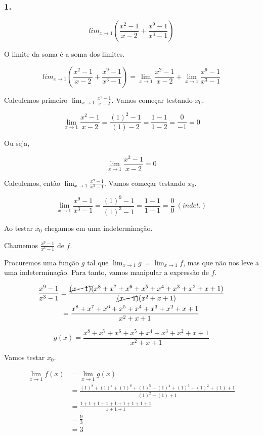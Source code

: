 \documentclass{article}
\begin{document}
\subsubsection*{1.}

\[
    lim_{x\to 1} \left(\frac{x^2-1}{x-2}+\frac{x^9-1}{x^3-1}\right)
\]

O limite da soma é a soma dos limites.

\begin{equation} \label{eq_lim_soma}
    lim_{x\to 1} \left(\frac{x^2-1}{x-2}+\frac{x^9-1}{x^3-1}\right)
    = \lim_{x\to 1} \frac{x^2-1}{x-2} + \lim_{x\to 1} \frac{x^9-1}{x^3-1}
\end{equation}

Calculemos primeiro \(\lim_{x\to 1} \frac{x^2-1}{x-2}\). Vamos começar testando \(x_0\).

\[
    \lim_{x\to 1} \frac{x^2-1}{x-2}
    = \frac{(1)^2-1}{(1)-2}
    = \frac{1-1}{1-2}
    = \frac{0}{-1}
    = 0
\]

Ou seja,

\begin{equation} \label{eq_lim_soma_1}
    \lim_{x\to 1} \frac{x^2-1}{x-2} = 0
\end{equation}

Calculemos, então \(\lim_{x\to 1} \frac{x^9-1}{x^3-1}\). Vamos começar testando \(x_0\).

\[
    \lim_{x\to 1} \frac{x^9-1}{x^3-1}
    = \frac{(1)^9-1}{(1)^3-1}
    = \frac{1-1}{1-1}
    = \frac{0}{0} \ (indet.)
\]

Ao testar \(x_0\) chegamos em uma indeterminação.

Chamemos \(\frac{x^9-1}{x^3-1}\) de \(f\).

Procuremos uma função \(g\) tal que \(\lim_{x\to 1} g\ = \lim_{x\to 1} f\), mas que não nos leve
a uma indeterminação. Para tanto, vamos manipular a expressão de \(f\).

\begin{multline*}
    \frac{x^9-1}{x^3-1}
    = \frac{\cancel{(x-1)}(x^8+x^7+x^6+x^5+x^4+x^3+x^2+x+1)}{\cancel{(x-1)}(x^2+x+1)} \\
    = \frac{x^8+x^7+x^6+x^5+x^4+x^3+x^2+x+1}{x^2+x+1}
\end{multline*}

\[
    g(x) = \frac{x^8+x^7+x^6+x^5+x^4+x^3+x^2+x+1}{x^2+x+1}
\]

Vamos testar \(x_0\).

\begin{align*}
    \lim_{x\to 1} f(x)
     & = \lim_{x\to 1} g(x)                                                  \\
     & = \frac{(1)^8+(1)^7+(1)^6+(1)^5+(1)^4+(1)^3+(1)^2+(1)+1}{(1)^2+(1)+1} \\
     & = \frac{1+1+1+1+1+1+1+1+1}{1+1+1}                                     \\
     & = \frac{9}{3}                                                         \\
     & = 3
\end{align*}
\end{document}

